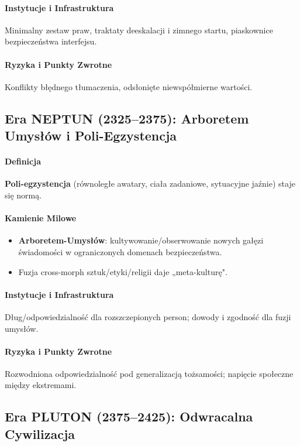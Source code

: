 \documentclass[11pt]{article}
\begin{document}
\paragraph{Instytucje i Infrastruktura} Minimalny zestaw praw, traktaty deeskalacji i zimnego startu, piaskownice bezpieczeństwa interfejsu.

\paragraph{Ryzyka i Punkty Zwrotne} Konflikty błędnego tłumaczenia, odsłonięte niewspółmierne wartości.

\subsection{Era NEPTUN (2325–2375): Arboretem Umysłów i Poli-Egzystencja}
\paragraph{Definicja} \textbf{Poli-egzystencja} (równoległe awatary, ciała zadaniowe, sytuacyjne jaźnie) staje się normą.

\paragraph{Kamienie Milowe}
\begin{itemize}[noitemsep]
  \item \textbf{Arboretem-Umysłów}: kultywowanie/obserwowanie nowych gałęzi świadomości w ograniczonych domenach bezpieczeństwa.
  \item Fuzja cross-morph sztuk/etyki/religii daje „meta-kulturę".
\end{itemize}

\paragraph{Instytucje i Infrastruktura} Dług/odpowiedzialność dla rozszczepionych person; dowody i zgodność dla fuzji umysłów.

\paragraph{Ryzyka i Punkty Zwrotne} Rozwodniona odpowiedzialność pod generalizacją tożsamości; napięcie społeczne między ekstremami.

\subsection{Era PLUTON (2375–2425): Odwracalna Cywilizacja}
\end{document}
